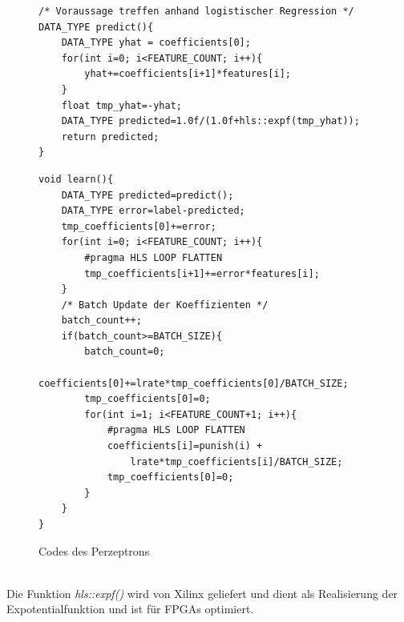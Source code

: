 \begin{figure}[ht]
\centering
\begin{lstlisting}
/* Voraussage treffen anhand logistischer Regression */
DATA_TYPE predict(){
    DATA_TYPE yhat = coefficients[0];
	for(int i=0; i<FEATURE_COUNT; i++){
		yhat+=coefficients[i+1]*features[i];
	}
	float tmp_yhat=-yhat;
	DATA_TYPE predicted=1.0f/(1.0f+hls::expf(tmp_yhat));
	return predicted;
}
\end{lstlisting}
\begin{lstlisting}
void learn(){
    DATA_TYPE predicted=predict();
    DATA_TYPE error=label-predicted;
    tmp_coefficients[0]+=error;
	for(int i=0; i<FEATURE_COUNT; i++){
		#pragma HLS LOOP FLATTEN
		tmp_coefficients[i+1]+=error*features[i];
	}
	/* Batch Update der Koeffizienten */
	batch_count++;
	if(batch_count>=BATCH_SIZE){
		batch_count=0;
		coefficients[0]+=lrate*tmp_coefficients[0]/BATCH_SIZE;
		tmp_coefficients[0]=0;
		for(int i=1; i<FEATURE_COUNT+1; i++){
			#pragma HLS LOOP FLATTEN
			coefficients[i]=punish(i) + 
				lrate*tmp_coefficients[i]/BATCH_SIZE;
			tmp_coefficients[0]=0;
		}
	}
}
\end{lstlisting}
\caption{Codes des Perzeptrons}
\end{figure}
\\Die Funktion \textit{hls::expf()} wird von Xilinx geliefert und dient als Realisierung der Expotentialfunktion und ist für FPGAs optimiert.\\ 


